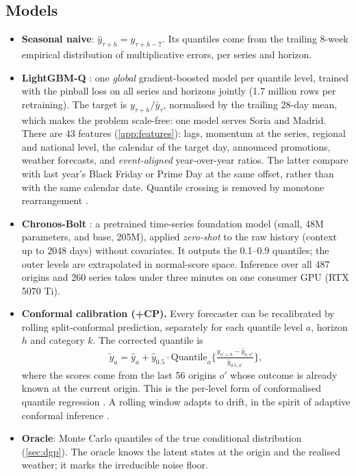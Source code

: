 \subsection{Models}
\begin{itemize}
  \item \textbf{Seasonal naive}: $\hat y_{\tau+h}=y_{\tau+h-7}$. Its quantiles come from the trailing 8-week empirical distribution of multiplicative errors, per series and horizon.
  \item \textbf{LightGBM-Q} \citep{ke2017}: one \emph{global} gradient-boosted model per quantile level, trained with the pinball loss on all series and horizons jointly (1.7 million rows per retraining). The target is $y_{\tau+h}/\bar y_\tau$, normalised by the trailing 28-day mean, which makes the problem scale-free: one model serves Soria and Madrid. There are 43 features (\cref{app:features}): lags, momentum at the series, regional and national level, the calendar of the target day, announced promotions, weather forecasts, and \emph{event-aligned} year-over-year ratios. The latter compare with last year's Black Friday or Prime Day at the same offset, rather than with the same calendar date. Quantile crossing is removed by monotone rearrangement \citep{chernozhukov2010}.
  \item \textbf{Chronos-Bolt} \citep{ansari2024}: a pretrained time-series foundation model (small, 48M parameters, and base, 205M), applied \emph{zero-shot} to the raw history (context up to 2048 days) without covariates. It outputs the 0.1--0.9 quantiles; the outer levels are extrapolated in normal-score space. Inference over all 487 origins and 260 series takes under three minutes on one consumer GPU (RTX 5070 Ti).
  \item \textbf{Conformal calibration (+CP).} Every forecaster can be recalibrated by rolling split-conformal prediction, separately for each quantile level $a$, horizon $h$ and category $k$. The corrected quantile is
  \[ \tilde y_a = \hat y_a + \hat y_{0.5}\cdot \mathrm{Quantile}_a\Big\{ \tfrac{y_{o'+h}-\hat y_{a,o'}}{\hat y_{0.5,o'}} \Big\}, \]
  where the scores come from the last 56 origins $o'$ whose outcome is already known at the current origin. This is the per-level form of conformalised quantile regression \citep{romano2019}. A rolling window adapts to drift, in the spirit of adaptive conformal inference \citep{gibbs2021}.
  \item \textbf{Oracle}: Monte Carlo quantiles of the true conditional distribution (\cref{sec:dgp}). The oracle knows the latent states at the origin and the realised weather; it marks the irreducible noise floor.
\end{itemize}

